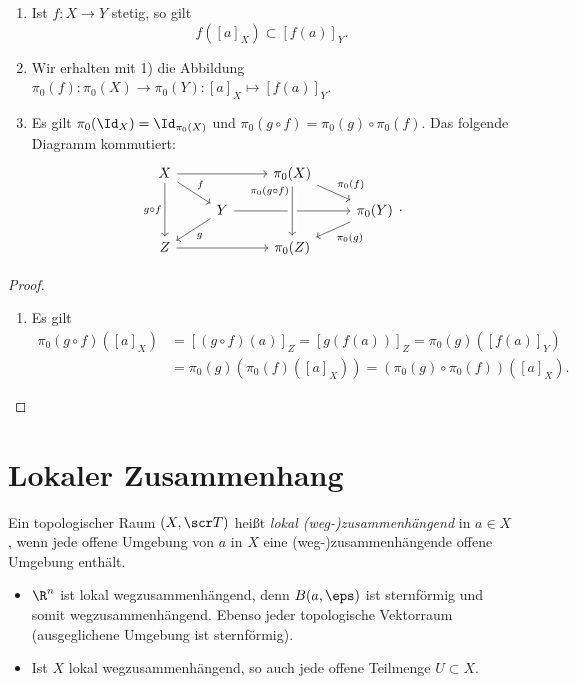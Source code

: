 \begin{st}
	\begin{enumerate}[1)]
		\item
			Ist $f: X \to Y$ stetig, so gilt
			\[
				f([a]_X) \subset [f(a)]_Y.
			\]
		\item
			Wir erhalten mit 1) die Abbildung \\ $\pi_0(f): \pi_0(X) \to \pi_0(Y): [a]_X \mapsto [f(a)]_Y$.
		\item
			Es gilt $\pi_0(\Id_X) = \Id_{\pi_0(X)}$ und $\pi_0(g \circ f) = \pi_0(g) \circ \pi_0(f)$.
			Das folgende Diagramm kommutiert:
			\[
				\begin{tikzcd}[row sep=small]
					X \arrow{dr}{f} \arrow{dd}[left]{g\circ f} \arrow{rr} &  & \pi_0(X) \arrow{dr}{\pi_0(f)} & \\
					& Y \arrow{dl}{g} \arrow{rr} &  & \pi_0(Y) \arrow{dl}{\pi_0(g)}\\
					Z \arrow{rr}  & & \pi_0(Z) \arrow[leftarrow, crossing over]{uu}[yshift=5mm]{\pi_0(g\circ f)} &
				\end{tikzcd}.
			\]
	\end{enumerate}
	\begin{proof}
		\begin{enumerate}[1),start=3]
			\item
				Es gilt
				\begin{align*}
					\pi_0(g\circ f)([a]_X)
					&= [(g\circ f)(a)]_Z
					= [g(f(a))]_Z
					= \pi_0(g)([f(a)]_Y) \\
					&= \pi_0(g)(\pi_0(f)([a]_X))
					= (\pi_0(g)\circ \pi_0(f))([a]_X).
				\end{align*}
		\end{enumerate}
	\end{proof}
\end{st}


\section{Lokaler Zusammenhang}


\begin{df}
	Ein topologischer Raum $(X, \scr T)$ heißt \emph{lokal (weg-)zusammenhängend} in $a \in X$, wenn jede offene Umgebung von $a$ in $X$ eine (weg-)zusammenhängende offene Umgebung enthält.
\end{df}

\begin{ex}
	\begin{itemize}
		\item
			$\R^n$ ist lokal wegzusammenhängend, denn $B(a,\eps)$ ist sternförmig und somit wegzusammenhängend.
			Ebenso jeder topologische Vektorraum (ausgeglichene Umgebung ist sternförmig).
		\item
			Ist $X$ lokal wegzusammenhängend, so auch jede offene Teilmenge $U \subset X$.
	\end{itemize}
\end{ex}

